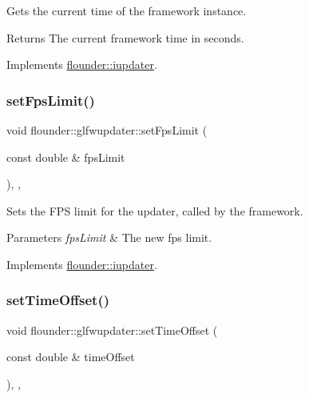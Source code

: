 Gets the current time of the framework instance. 

\begin{DoxyReturn}{Returns}
The current framework time in seconds. 
\end{DoxyReturn}


Implements \hyperlink{classflounder_1_1iupdater_a071086b844e1f90d7f3577e80c9c09fe}{flounder\+::iupdater}.

\mbox{\label{classflounder_1_1glfwupdater_a8beaa82a7604b9ae11baf3f822e86113}} 
\subsubsection{\texorpdfstring{set\+Fps\+Limit()}{setFpsLimit()}}
{\footnotesize\ttfamily void flounder\+::glfwupdater\+::set\+Fps\+Limit (\begin{DoxyParamCaption}\item[{const double \&}]{fps\+Limit }\end{DoxyParamCaption})\hspace{0.3cm}{\ttfamily [inline]}, {\ttfamily [override]}, {\ttfamily [virtual]}}



Sets the F\+PS limit for the updater, called by the framework. 


\begin{DoxyParams}{Parameters}
{\em fps\+Limit} & The new fps limit. \\
\hline
\end{DoxyParams}


Implements \hyperlink{classflounder_1_1iupdater_a09eee014e76b7a0217d2bcdf41e0f3f4}{flounder\+::iupdater}.

\mbox{\label{classflounder_1_1glfwupdater_a7dc4371863e39a3a7870e4a2ac539fed}} 
\subsubsection{\texorpdfstring{set\+Time\+Offset()}{setTimeOffset()}}
{\footnotesize\ttfamily void flounder\+::glfwupdater\+::set\+Time\+Offset (\begin{DoxyParamCaption}\item[{const double \&}]{time\+Offset }\end{DoxyParamCaption})\hspace{0.3cm}{\ttfamily [inline]}, {\ttfamily [override]}, {\ttfamily [virtual]}}




